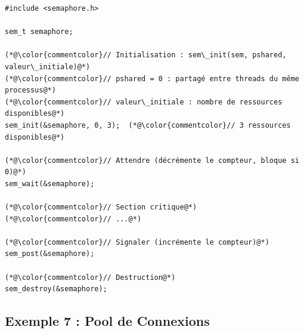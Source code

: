 \documentclass[11pt,a4paper]{article}
\begin{document}
\begin{lstlisting}[caption={Utilisation des sémaphores}]
#include <semaphore.h>

sem_t semaphore;

(*@\color{commentcolor}// Initialisation : sem\_init(sem, pshared, valeur\_initiale)@*)
(*@\color{commentcolor}// pshared = 0 : partagé entre threads du même processus@*)
(*@\color{commentcolor}// valeur\_initiale : nombre de ressources disponibles@*)
sem_init(&semaphore, 0, 3);  (*@\color{commentcolor}// 3 ressources disponibles@*)

(*@\color{commentcolor}// Attendre (décrémente le compteur, bloque si 0)@*)
sem_wait(&semaphore);

(*@\color{commentcolor}// Section critique@*)
(*@\color{commentcolor}// ...@*)

(*@\color{commentcolor}// Signaler (incrémente le compteur)@*)
sem_post(&semaphore);

(*@\color{commentcolor}// Destruction@*)
sem_destroy(&semaphore);
\end{lstlisting}

\subsection{Exemple 7 : Pool de Connexions}
\end{document}
